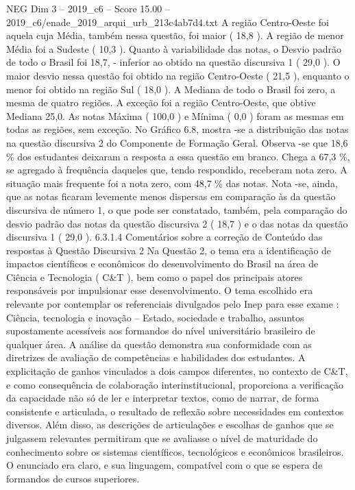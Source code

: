 \begin{textsample}{NEG Dim 3 – 2019\_c6 – Score 15.00 – 2019\_c6/enade\_2019\_arqui\_urb\_213c4ab7d4.txt}
A região Centro-Oeste foi aquela cuja Média, também nessa questão, foi maior ( 18,8 ).
A região de menor Média foi a Sudeste ( 10,3 ).
Quanto à variabilidade das notas, o Desvio padrão de todo o Brasil foi 18,7, - inferior ao obtido na questão discursiva 1 ( 29,0 ).
O maior desvio nessa questão foi obtido na região Centro-Oeste ( 21,5 ), enquanto o menor foi obtido na região Sul ( 18,0 ).
A Mediana de todo o Brasil foi zero, a mesma de quatro regiões.
A exceção foi a região Centro-Oeste, que obtive Mediana 25,0.
As notas Máxima ( 100,0 ) e Mínima ( 0,0 ) foram as mesmas em todas as regiões, sem exceção.
No Gráfico 6.8, mostra -se a distribuição das notas na questão discursiva 2 do Componente de Formação Geral.
Observa -se que 18,6 \% dos estudantes deixaram a resposta a essa questão em branco.
Chega a 67,3 \%, se agregado à frequência daqueles que, tendo respondido, receberam nota zero.
A situação mais frequente foi a nota zero, com 48,7 \% das notas.
Nota -se, ainda, que as notas ficaram levemente menos dispersas em comparação às da questão discursiva de número 1, o que pode ser constatado, também, pela comparação do desvio padrão das notas da questão discursiva 2 ( 18,7 ) e o das notas da questão discursiva 1 ( 29,0 ). 6.3.1.4 Comentários sobre a correção de Conteúdo das respostas à Questão Discursiva 2 Na Questão 2, o tema era a identificação de impactos científicos e econômicos do desenvolvimento do Brasil na área de Ciência e Tecnologia ( C\&T ), bem como o papel dos principais atores responsáveis por impulsionar esse desenvolvimento.
O tema escolhido era relevante por contemplar os referenciais divulgados pelo Inep para esse exame : Ciência, tecnologia e inovação – Estado, sociedade e trabalho, assuntos supostamente acessíveis aos formandos do nível universitário brasileiro de qualquer área.
A análise da questão demonstra sua conformidade com as diretrizes de avaliação de competências e habilidades dos estudantes.
A explicitação de ganhos vinculados a dois campos diferentes, no contexto de C\&T, e como consequência de colaboração interinstitucional, proporciona a verificação da capacidade não só de ler e interpretar textos, como de narrar, de forma consistente e articulada, o resultado de reflexão sobre necessidades em contextos diversos.
Além disso, as descrições de articulações e escolhas de ganhos que se julgassem relevantes permitiram que se avaliasse o nível de maturidade do conhecimento sobre os sistemas científicos, tecnológicos e econômicos brasileiros.
O enunciado era claro, e sua linguagem, compatível com o que se espera de formandos de cursos superiores.

\end{textsample}
